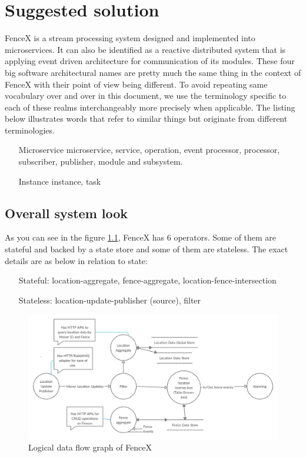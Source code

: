 \documentclass[a4]{report}
\begin{document}
        \chapter{Suggested solution}
        FenceX is a stream processing system designed and implemented into microservices.
        It can also be identified as a reactive distributed system that is applying event driven architecture for
        communication of its modules.
        These four big software architectural names are pretty much the same thing in the context of FenceX with their
        point of view being different.
        To avoid repeating same vocabulary over and over in this document, we use the terminology specific to each of
        these realms interchangeably more precisely when applicable.
        The listing below illustrates words that refer to similar things but originate from different terminologies.

        \begin{itemize}
            \item[Microservice] microservice, service, operation, event processor,  processor, subscriber, publisher, module and subsystem.
            \item[Instance] instance, task
        \end{itemize}

        \section{Overall system look}
        As you can see in the figure \ref{fig:logical-dfg}, FenceX has 6 operators.
        Some of them are stateful and backed by a state store and some of them are stateless.
        The exact details are as below in relation to state:

        \begin{itemize}
            \item[Stateful:] location-aggregate, fence-aggregate, location-fence-intersection
            \item[Stateless:] location-update-publisher (source), filter
        \end{itemize}

        \begin{figure}[ht]
            \caption{Logical data flow graph of FenceX}
            \label{fig:logical-dfg}
            \includegraphics[scale=0.2]{images/logical-data-flow-diagram.png}
        \end{figure}
\end{document}
